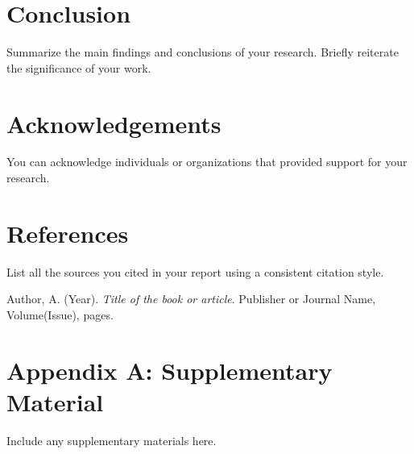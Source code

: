 \documentclass[12pt]{article}
\begin{document}
\section{Conclusion}
\label{sec:conclusion}
Summarize the main findings and conclusions of your research. Briefly reiterate the significance of your work.

\section*{Acknowledgements}
You can acknowledge individuals or organizations that provided support for your research.

\section*{References}
\label{sec:references}
List all the sources you cited in your report using a consistent citation style.

\begin{thebibliography}{99}
   Author, A. (Year). \textit{Title of the book or article}. Publisher or Journal Name, Volume(Issue), pages.
\end{thebibliography}

\appendix
\section{Appendix A: Supplementary Material}
Include any supplementary materials here.

\end{document}
